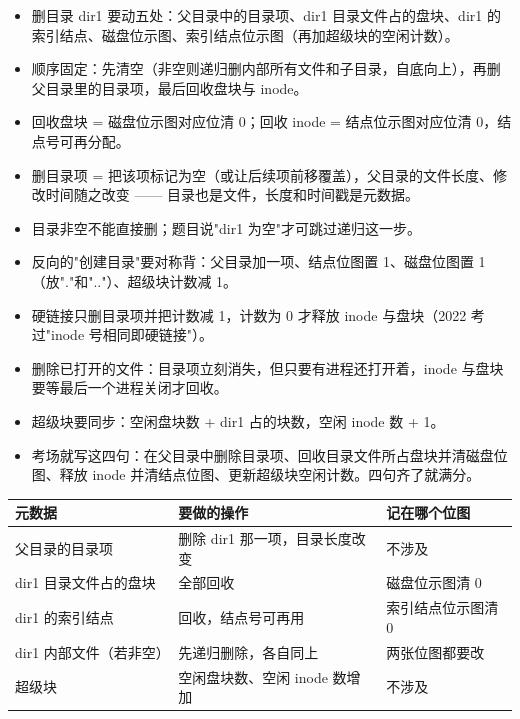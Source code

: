 \documentclass[10pt,a4paper]{ctexart}
\begin{document}
\begin{itemize}

\item 删目录 dir1 要动五处：父目录中的目录项、dir1 目录文件占的盘块、dir1 的索引结点、磁盘位示图、索引结点位示图（再加超级块的空闲计数）。

\item 顺序固定：先清空（非空则递归删内部所有文件和子目录，自底向上），再删父目录里的目录项，最后回收盘块与 inode。

\item 回收盘块 = 磁盘位示图对应位清 0；回收 inode = 结点位示图对应位清 0，结点号可再分配。

\item 删目录项 = 把该项标记为空（或让后续项前移覆盖），父目录的文件长度、修改时间随之改变 —— 目录也是文件，长度和时间戳是元数据。

\item 目录非空不能直接删；题目说"dir1 为空"才可跳过递归这一步。

\item 反向的"创建目录"要对称背：父目录加一项、结点位图置 1、磁盘位图置 1（放"."和".."）、超级块计数减 1。

\item 硬链接只删目录项并把计数减 1，计数为 0 才释放 inode 与盘块（2022 考过"inode 号相同即硬链接"）。

\item 删除已打开的文件：目录项立刻消失，但只要有进程还打开着，inode 与盘块要等最后一个进程关闭才回收。

\item 超级块要同步：空闲盘块数 + dir1 占的块数，空闲 inode 数 + 1。

\item 考场就写这四句：在父目录中删除目录项、回收目录文件所占盘块并清磁盘位图、释放 inode 并清结点位图、更新超级块空闲计数。四句齐了就满分。

\end{itemize}

\begin{center}\small
\begin{tabularx}{\linewidth}{@{}>{\raggedright\arraybackslash}X>{\raggedright\arraybackslash}X>{\raggedright\arraybackslash}X@{}}
\toprule
元数据 & 要做的操作 & 记在哪个位图 \\
\midrule
父目录的目录项 & 删除 dir1 那一项，目录长度改变 & 不涉及 \\
dir1 目录文件占的盘块 & 全部回收 & 磁盘位示图清 0 \\
dir1 的索引结点 & 回收，结点号可再用 & 索引结点位示图清 0 \\
dir1 内部文件（若非空） & 先递归删除，各自同上 & 两张位图都要改 \\
超级块 & 空闲盘块数、空闲 inode 数增加 & 不涉及 \\
\bottomrule
\end{tabularx}
\end{center}
\end{document}

